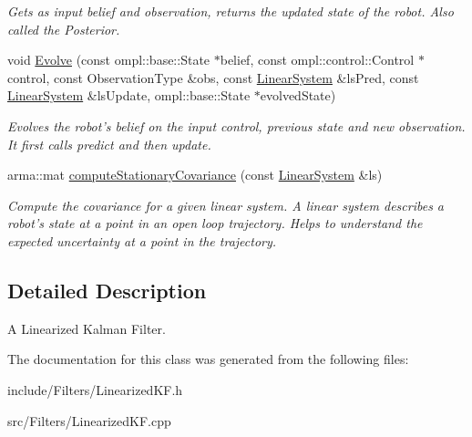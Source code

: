 \begin{DoxyCompactItemize}
\begin{DoxyCompactList}\small\item\em \-Gets as input belief and observation, returns the updated state of the robot. \-Also called the \-Posterior. \end{DoxyCompactList}\item 
\hypertarget{class_linearized_k_f_a9de5546e208e7c49ce443c94625cbebc}{void \hyperlink{class_linearized_k_f_a9de5546e208e7c49ce443c94625cbebc}{\-Evolve} (const ompl\-::base\-::\-State $\ast$belief, const ompl\-::control\-::\-Control $\ast$control, const \-Observation\-Type \&obs, const \hyperlink{class_linear_system}{\-Linear\-System} \&ls\-Pred, const \hyperlink{class_linear_system}{\-Linear\-System} \&ls\-Update, ompl\-::base\-::\-State $\ast$evolved\-State)}\label{class_linearized_k_f_a9de5546e208e7c49ce443c94625cbebc}

\begin{DoxyCompactList}\small\item\em \-Evolves the robot's belief on the input control, previous state and new observation. \-It first calls predict and then update. \end{DoxyCompactList}\item 
\hypertarget{class_linearized_k_f_addb9369d36e6d9fcb49668f8ca19ad97}{arma\-::mat \hyperlink{class_linearized_k_f_addb9369d36e6d9fcb49668f8ca19ad97}{compute\-Stationary\-Covariance} (const \hyperlink{class_linear_system}{\-Linear\-System} \&ls)}\label{class_linearized_k_f_addb9369d36e6d9fcb49668f8ca19ad97}

\begin{DoxyCompactList}\small\item\em \-Compute the covariance for a given linear system. \-A linear system describes a robot's state at a point in an open loop trajectory. \-Helps to understand the expected uncertainty at a point in the trajectory. \end{DoxyCompactList}\end{DoxyCompactItemize}


\subsection{\-Detailed \-Description}
\-A \-Linearized \-Kalman \-Filter. 

\-The documentation for this class was generated from the following files\-:\begin{DoxyCompactItemize}
\item 
include/\-Filters/\-Linearized\-K\-F.\-h\item 
src/\-Filters/\-Linearized\-K\-F.\-cpp\end{DoxyCompactItemize}
